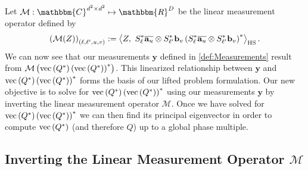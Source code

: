 \documentclass[]{spie}  %
\def \a {\mathbf a}
\def \b {\mathbf b}
\def \y {\mathbf y}
\begin{document}
Let $\mathcal{M}: \mathbbm{C}^{d^2 \times d^2} \mapsto \mathbbm{R}^D$ be the linear measurement operator defined by 
\begin{equation}
\left(\mathcal{M}(Z) \right)_{(\ell,\ell',u,v)} := \left\langle  Z, ~S^*_{\ell} \overline{\a_u} \otimes S^*_{\ell'} \b_v \left( S^*_{\ell} \overline{\a_u} \otimes S^*_{\ell'} \b_v \right)^*\right\rangle_{\rm HS}.
\label{Def:Measure_Operator}
\end{equation}
We can now see that our measurements $\y$ defined in \eqref{def:Measurements} result from $\mathcal{M}\left( {\rm vec}\left(Q^* \right) \left( {\rm vec} \left(Q^* \right) \right)^* \right)$.  This linearized relationship between $\y$ and ${\rm vec}\left(Q^* \right) \left( {\rm vec} \left(Q^* \right) \right)^*$ forms the basis of our lifted problem formulation.  Our new objective is to solve for ${\rm vec}\left(Q^* \right) \left( {\rm vec} \left(Q^* \right) \right)^*$ using our measurements $\y$ by inverting the linear measurement operator $\mathcal{M}$.  Once we have solved for ${\rm vec}\left(Q^* \right) \left( {\rm vec} \left(Q^* \right) \right)^*$ we can then find its principal eigenvector in order to compute ${\rm vec}\left(Q^* \right)$ (and therefore $Q$) up to a global phase multiple.

\subsection{Inverting the Linear Measurement Operator $\mathcal{M}$}
\end{document}
